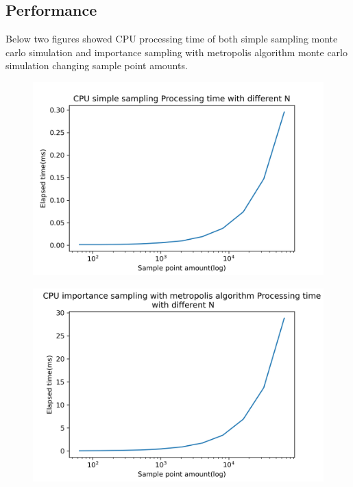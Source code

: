 \documentclass{article}
\begin{document}
	\subsection{Performance}
	Below two figures showed CPU processing time of both simple sampling monte carlo simulation and importance sampling with metropolis algorithm monte carlo simulation changing sample point amounts.
	\begin{figure}[hb!]
		\centering
		\includegraphics[width=0.9\linewidth]{notebook/cpu_ss}
	\end{figure}
	\begin{figure}[hb!]
		\centering
		\includegraphics[width=0.9\linewidth]{notebook/cpu_mis}
	\end{figure}
	\newpage
	
\end{document}
